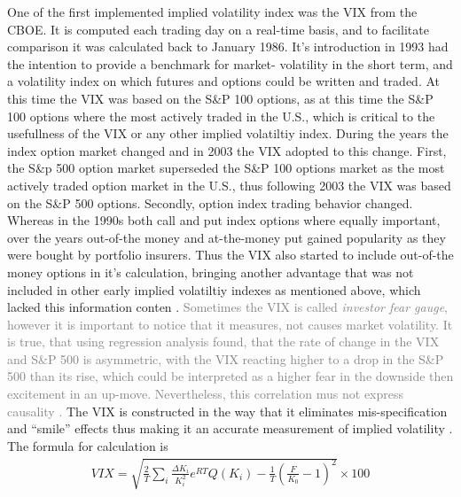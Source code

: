 One of the first implemented implied volatility index was the VIX from the \gls{CBOE}. It is computed each trading day on a real-time basis, and to facilitate comparison it was calculated back to January 1986. It's introduction in 1993 had the intention to provide a benchmark for market- volatility in the short term, and a volatility index on which futures and options could be written and traded. At this time the VIX was based on the S\&P 100 options, as at this time the S\&P 100 options where the most actively traded in the U.S., which is critical to the usefullness of the VIX or any other implied volatiltiy index. During the years the index option market changed and in 2003 the VIX adopted to this change. First, the S\&p 500 option market superseded the S\&P 100 options market as the most actively traded option market in the U.S., thus following 2003 the VIX was based on the S\&P 500 options. Secondly, option index trading behavior changed. Whereas in the 1990s both call and put index options where equally important, over the years out-of-the money and at-the-money put gained popularity as they were bought by portfolio insurers. Thus the VIX also started to include out-of-the money options in it's calculation, bringing another advantage that was not included in other early implied volatiltiy indexes as mentioned above, which lacked this information conten \parencite{whaley2008}. \textcolor{gray} {Sometimes the VIX is called \emph{investor fear gauge}, however it is important to notice that it measures, not causes market volatility. It is true, that using regression analysis \textcite{whaley2008} found, that the rate of change in the VIX and S\&P 500 is asymmetric, with the VIX reacting higher to a drop in the S\&P 500 than its rise, which could be interpreted as a higher fear in the downside then excitement in an up-move. Nevertheless, this correlation mus not express causality \parencite{whaley2008}.} The VIX is constructed in the way that it eliminates mis-specification and ``smile'' effects thus making it an accurate measurement of implied volatility \parencite{blair2000}. The formula for calculation is
\begin{align}\label{eq: VIX}
VIX = \sqrt{\frac{2}{T} \sum_{i} \frac{\Delta K_{i}}{K_{i}^{2}} e^{RT} Q(K_{i}) - \frac{1}{T} (\frac{F}{K_{0}} - 1)^{2}} \times 100
\end{align}
